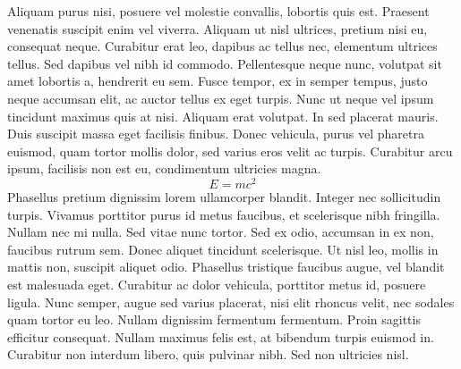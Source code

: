 \documentclass[11pt]{article}
\begin{document}
Aliquam purus nisi, posuere vel molestie convallis, lobortis quis est. Praesent
venenatis suscipit enim vel viverra. Aliquam ut nisl ultrices, pretium nisi eu,
consequat neque. Curabitur erat leo, dapibus ac tellus nec, elementum ultrices
tellus. Sed dapibus vel nibh id commodo. Pellentesque neque nunc, volutpat sit
amet lobortis a, hendrerit eu sem. Fusce tempor, ex in semper tempus, justo
neque accumsan elit, ac auctor tellus ex eget turpis. Nunc ut neque vel ipsum
tincidunt maximus quis at nisi. Aliquam erat volutpat. In sed placerat mauris.
Duis suscipit massa eget facilisis finibus. Donec vehicula, purus vel pharetra
euismod, quam tortor mollis dolor, sed varius eros velit ac turpis. Curabitur
arcu ipsum, facilisis non est eu, condimentum ultricies magna.
\[
    E=mc^{2}
\]
Phasellus pretium dignissim lorem ullamcorper blandit. Integer nec sollicitudin
turpis. Vivamus porttitor purus id metus faucibus, et scelerisque nibh
fringilla. Nullam nec mi nulla. Sed vitae nunc tortor. Sed ex odio, accumsan in
ex non, faucibus rutrum sem. Donec aliquet tincidunt scelerisque. Ut nisl leo,
mollis in mattis non, suscipit aliquet odio. Phasellus tristique faucibus
augue, vel blandit est malesuada eget. Curabitur ac dolor vehicula, porttitor
metus id, posuere ligula. Nunc semper, augue sed varius placerat, nisi elit
rhoncus velit, nec sodales quam tortor eu leo. Nullam dignissim fermentum
fermentum. Proin sagittis efficitur consequat. Nullam maximus felis est, at
bibendum turpis euismod in. Curabitur non interdum libero, quis pulvinar nibh.
Sed non ultricies nisl.
\end{document}
